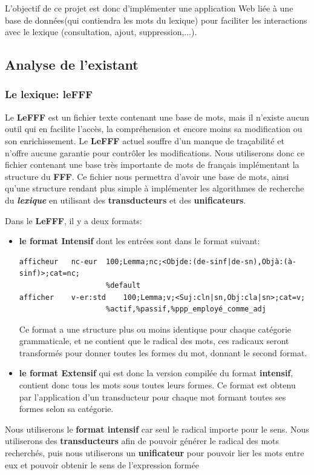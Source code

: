 \documentclass[a4paper, 12pt]{article}
\begin{document}
{L'objectif de ce projet est donc d'implémenter une application Web liée à une base de données(qui contiendra les mots du lexique) pour faciliter les interactions avec le lexique (consultation, ajout, suppression,...).\par}


\subsection{Analyse de l'existant}

\subsubsection{Le lexique: leFFF}
{Le \textbf{LeFFF} est un fichier texte contenant une base de mots, mais il n'existe aucun outil qui en facilite l'accès, la compréhension et encore moins sa modification ou son enrichissement. Le \textbf{LeFFF} actuel souffre d'un manque de traçabilité et n'offre aucune garantie pour contrôler les modifications. Nous utiliserons donc ce fichier contenant une base très importante de mots de français implémentant la structure du \textbf{FFF}. Ce fichier nous permettra d'avoir une base de mots, ainsi qu'une structure rendant plus simple à implémenter les algorithmes de recherche du \textit{\bf lexique} en utilisant des \textbf{transducteurs} et des \textbf{unificateurs}.\par}
{Dans le \textbf{LeFFF}, il y a deux formats:\par}
\begin{itemize}
\item \textbf{le format Intensif} dont les entrées sont dans le format suivant:
\small
\begin{verbatim}
afficheur	nc-eur	100;Lemma;nc;<Objde:(de-sinf|de-sn),Objà:(à-sinf)>;cat=nc;
                    %default
afficher	v-er:std	100;Lemma;v;<Suj:cln|sn,Obj:cla|sn>;cat=v;
                    %actif,%passif,%ppp_employé_comme_adj
\end{verbatim}
\normalsize
Ce format a une structure plus ou moins identique pour chaque catégorie grammaticale, et ne contient que le radical des mots, ces radicaux seront transformés pour donner toutes les formes du mot, donnant le second format.
\item \textbf{le format Extensif} qui est donc la version compilée du format \textbf{intensif}, contient donc tous les mots sous toutes leurs formes. Ce format est obtenu par l'application d'un transducteur pour chaque mot formant toutes ses formes selon sa catégorie.
\end{itemize}
{Nous utiliserons le \textbf{format intensif} car seul le radical importe pour le sens. Nous utiliserons des \textbf{transducteurs} afin de pouvoir générer le radical des mots recherchés, puis nous utiliserons un \textbf{unificateur} pour pouvoir lier les mots entre eux et pouvoir obtenir le sens de l'expression formée}
\end{document}
